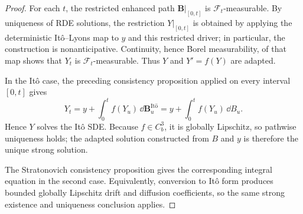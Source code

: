 \begin{proof}
For each $t$, the restricted enhanced path
$\mathbf B|_{[0,t]}$ is $\mathcal F_t$-measurable.  By uniqueness of RDE
solutions, the restriction $Y|_{[0,t]}$ is obtained by applying the
deterministic It\^o--Lyons map to $y$ and this restricted driver; in
particular, the construction is nonanticipative.  Continuity, hence Borel
measurability, of that map shows that $Y_t$ is $\mathcal F_t$-measurable.
Thus $Y$ and $Y'=f(Y)$ are adapted.

In the It\^o case, the preceding consistency proposition applied on every
interval $[0,t]$ gives
\[
  Y_t=y+\int_0^tf(Y_u)\,\dd\mathbf B^{\mathrm{It\hat{o}}}_u
     =y+\int_0^tf(Y_u)\,\dd B_u.
\]
Hence $Y$ solves the It\^o SDE.  Because $f\in C_b^3$, it is globally
Lipschitz, so pathwise uniqueness holds; the adapted solution constructed from
$B$ and $y$ is therefore the unique strong solution.

The Stratonovich consistency proposition gives the corresponding integral
equation in the second case.  Equivalently, conversion to It\^o form produces
bounded globally Lipschitz drift and diffusion coefficients, so the same
strong existence and uniqueness conclusion applies.
\end{proof}

